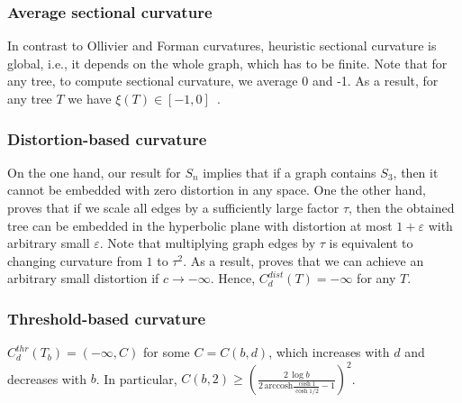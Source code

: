\documentclass[runningheads]{llncs}
\newcommand{\ch}[1]{{\color{red} #1}}
\begin{document}


\subsubsection{Average sectional curvature} In contrast to Ollivier and Forman curvatures, heuristic sectional curvature is global, i.e., it depends on the whole graph, which has to be finite. Note that for any tree, to compute sectional curvature, we average 0 and -1. As a result, for any tree $T$ we have $\xi(T) \in [-1,0]$~\cite{gu2019learning}.

\subsubsection{Distortion-based curvature} 

On the one hand, our result for $S_n$ implies that if a graph contains $S_3$, then it cannot be embedded with zero distortion in any space. One the other hand, \cite{sarkar2011low} proves that if we scale all edges by a sufficiently large factor $\tau$, then the obtained tree can be embedded \ch{in} the hyperbolic plane with distortion at most $1 + \varepsilon$ with arbitrary small $\varepsilon$. Note that multiplying graph edges by $\tau$ is equivalent to changing curvature from $1$ to $\tau^2$. As a result, \cite{sarkar2011low} proves that we can achieve an arbitrary small distortion if $c \to -\infty$.
Hence, $C_d^{dist}(T) = -\infty$ for any $T$.

\subsubsection{Threshold-based curvature} 


\begin{theorem}\label{thm:tree_threshold}
$C_d^{thr}(T_b) = (-\infty, C)$ for some $C = C(b,d)$, which increases with $d$ and decreases with $b$. 
In particular, $C(b,2) \ge \left( \frac{2\,\log b}{2 \, \mathrm{arccosh} \frac{\cosh 1}{\cosh 1/2} - 1} \right)^2$.
\end{theorem}
\end{document}
